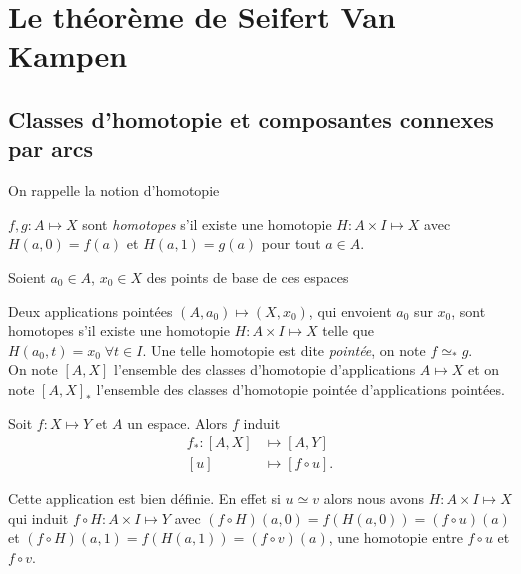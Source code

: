 \documentclass[main.tex]{subfiles}
\begin{document}
	\chapter{Le théorème de Seifert Van Kampen}	
	\section{Classes d'homotopie et composantes connexes par arcs}

	\begin{rap}
		On rappelle la notion d'homotopie \\

		\begin{minipage}{0.5\textwidth}
			$f,g : A \longmapsto X$ sont \emph{homotopes} s'il existe une homotopie $H : A \times I \longmapsto X$ avec $H(a,0) = f(a)$ et  $H(a,1) =g(a)$ pour tout $a \in A$.	
		\end{minipage}
		\hfill
		\begin{minipage}{0.5\textwidth}
			\centering
			\def\svgwidth{0.7\textwidth}
				
		\end{minipage}
	\end{rap}

	Soient $a_{0} \in A$, $x_{0} \in X$ des points de base de ces espaces

	\begin{definition}
		Deux applications pointées $(A,a_{0}) \mapsto (X,x_{0})$, qui envoient $a_{0}$ sur $x_{0}$, sont homotopes s'il existe une homotopie $H : A \times I \longmapsto X$ telle que $H(a_{0},t) = x_{0} \; \forall t \in I$. Une telle homotopie est dite \emph{pointée}, on note $f \simeq_{*} g$.\\
		On note $[A,X]$ l'ensemble des classes d'homotopie d'applications  $A \longmapsto X$ et on note $[A,X]_{*}$ l'ensemble des classes d'homotopie pointée d'applications pointées.
	\end{definition}
		
	\begin{definition}[Fonctorialité]
		Soit $f : X \longmapsto Y$ et $A$ un espace. Alors $f$ induit 
		 \begin{align*}
			 f_{*} : [A,X] &\longmapsto [A,Y] \\
			 [u] &\longmapsto [f\circ u]
		.\end{align*}
	\end{definition}
	Cette application est bien définie. En effet si $u \simeq v$ alors nous avons $H : A \times I \longmapsto X$ qui induit $f\circ H : A \times I \longmapsto Y$ avec $(f\circ H)(a,0) = f(H(a,0)) = (f\circ u)(a)$ et $(f\circ H)(a,1) = f(H(a,1)) = (f\circ v)(a)$, une homotopie entre $f\circ u$ et $f\circ v$.
\end{document}
